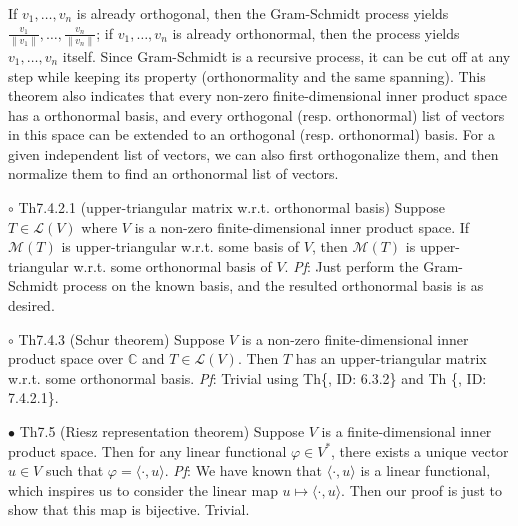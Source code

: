 \documentclass{article}
\begin{document}
\begin{Rmk}{}
    \textcolor{Th}{If $v_1, \dots, v_n$ is already orthogonal, then the Gram-Schmidt process yields $\frac{v_1}{\|v_1\|}, \dots, \frac{v_n}{\|v_n\|}$; if $v_1, \dots, v_n$ is already orthonormal, then the process yields $v_1, \dots, v_n$ itself.} Since Gram-Schmidt is a recursive process, it can be cut off at any step while keeping its property (orthonormality and the same spanning).
    This theorem also indicates that \textcolor{Th}{every non-zero finite-dimensional inner product space has a orthonormal basis, and every orthogonal (resp. orthonormal) list of vectors in this space can be extended to an orthogonal (resp. orthonormal) basis.} For a given independent list of vectors, we can also first orthogonalize them, and then normalize them to find an orthonormal list of vectors.
\end{Rmk}

\begin{Th}{$\circ$ Th7.4.2.1 (upper-triangular matrix w.r.t. orthonormal basis)}
    Suppose $T\in\mathcal{L}(V)$ where $V$ is a non-zero finite-dimensional inner product space. If $\mathcal{M}(T)$ is upper-triangular w.r.t. some basis of $V$, then $\mathcal{M}(T)$ is upper-triangular w.r.t. some orthonormal basis of $V$.
    \tcblower
    \textit{Pf}: Just perform the Gram-Schmidt process on the known basis, and the resulted orthonormal basis is as desired.
\end{Th}

\begin{Th}{$\circ$ Th7.4.3 (Schur theorem)}
    Suppose $V$ is a non-zero finite-dimensional inner product space over $\mathbb{C}$ and $T\in\mathcal{L}(V)$. Then $T$ has an upper-triangular matrix w.r.t. some orthonormal basis.
    \tcblower
    \textit{Pf}: Trivial using Th\{, ID: 6.3.2\} and Th \{, ID: 7.4.2.1\}.
\end{Th}

\begin{Th}{$\bullet$ Th7.5 (Riesz representation theorem)}
    Suppose $V$ is a finite-dimensional inner product space. Then for any linear functional $\varphi\in V^\ast$, there exists a unique vector $u\in V$ such that $\varphi = \langle \cdot, u\rangle$.
    \tcblower
    \textit{Pf}: We have known that $\langle \cdot, u\rangle$ is a linear functional, which inspires us to consider the linear map $u\mapsto \langle \cdot, u\rangle$. Then our proof is just to show that this map is bijective. Trivial.
\end{Th}
\end{document}
